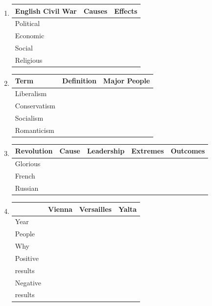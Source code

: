 \documentclass[12pt]{article}
\begin{document}
\begin{enumerate}
\begin{tabular}{|l|l|l|l|l|l|}
\end{tabular}

\item \begin{tabular}{|l|l|l|}

\hline
English Civil War & Causes & Effects \\
\hline
Political & & \\
\hline
Economic & & \\
\hline
Social & & \\
\hline
Religious & & \\
\hline

\end{tabular}

\item \begin{tabular}{|l|l|l|}

\hline
Term & Definition & Major People \\
\hline
Liberalism & & \\
\hline
Conservatism & & \\
\hline
Socialism & & \\
\hline
Romanticism & & \\
\hline
\end{tabular}

\item \begin{tabular}{|l|l|l|l|l|}

\hline
Revolution & Cause & Leadership & Extremes & Outcomes \\
\hline
Glorious & & & & \\
\hline
French & & & & \\
\hline
Russian & & & & \\
\hline
\end{tabular}

\item \begin{tabular}{|l|l|l|l|} 

\hline
& Vienna & Versailles & Yalta \\
\hline
Year & & & \\
\hline
People & & & \\
\hline
Why & & & \\
\hline
Positive & & & \\
results & & & \\
\hline
Negative & & & \\
results & & & \\
\hline
\end{tabular}

\end{enumerate}
\end{document}
